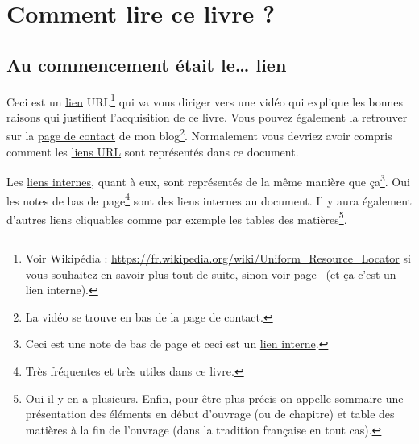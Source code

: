 \chapter{Comment lire ce livre ?}\label{chap:howto}




\newpage
\minitoc
\newpage

\section{Au commencement était le\dots\xspace lien}\label{sec:link}

Ceci est un \href{https://youtu.be/K88qlGcd7Ek}{lien}
\hypertarget{url}{URL}\footnote{Voir Wikipédia :
  \url{https://fr.wikipedia.org/wiki/Uniform_Resource_Locator} si vous
  souhaitez en savoir plus tout de suite, sinon voir
  page~\pageref{sec:side} (et ça c'est un lien interne).} qui va vous diriger vers une vidéo qui
explique les bonnes raisons qui justifient l'acquisition de ce
livre. Vous pouvez également la retrouver sur la \href{http://doyouspeakenglish.fr/contact/}{page de contact} de mon
blog\footnote{La vidéo se trouve en bas de la page de contact.}. Normalement vous
devriez avoir compris comment les
\href{https://fr.wikipedia.org/wiki/Uniform_Resource_Locator}{liens
  URL} sont représentés dans ce document.

Les \hyperlink{linkin}{liens internes}, quant à eux,
\hypertarget{retour}{sont}\label{retour} représentés de la même
manière que ça\footnote{Ceci est une note de bas de page et ceci est
  un \hyperlink{linkin}{lien interne}.}. Oui les notes de bas de
page\footnote{Très fréquentes et très utiles dans ce livre.} sont des
liens internes au document. Il y aura également d'autres liens
cliquables comme par exemple les tables des matières\footnote{Oui il y
  en a plusieurs. Enfin, pour être plus précis on appelle sommaire une
présentation des éléments en début d'ouvrage (ou de chapitre) et table
des matières à la fin de l'ouvrage (dans la tradition française en
tout cas).}. 

